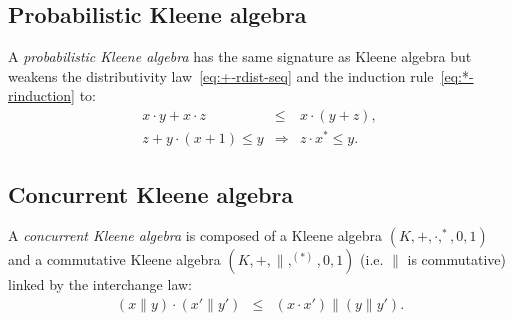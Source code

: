 \documentclass[review]{elsart}
\newenvironment{append}{}{}
\begin{document}
\begin{append}
\subsection{Probabilistic Kleene algebra}
A \emph{probabilistic Kleene algebra} has the same signature as Kleene algebra but weakens the distributivity law~\ref{eq:+-rdist-seq} and the induction rule~\ref{eq:*-rinduction} to:
\begin{eqnarray}
x{\cdot} y+x{\cdot} z & \leq & x {\cdot} (y+z),\label{eq:+-subdist-seq}\\
z+y{\cdot} (x+1)\leq y& \Rightarrow &z{\cdot} x^*\leq y.\label{eq:*-rweakinduction}
\end{eqnarray}
\subsection{Concurrent Kleene algebra}
A \emph{concurrent Kleene algebra} is composed of a Kleene algebra $(K,+,\cdot,^*,0,1)$ and a commutative Kleene algebra $(K,+,\|,^{(*)},0,1)$ (i.e. $\|$ is commutative) linked by the interchange law:
\begin{eqnarray}
	(x\|y)\cdot(x'\|y')&\leq& (x\cdot x')\|(y\|y').
\end{eqnarray}
\end{append}
\end{document}

